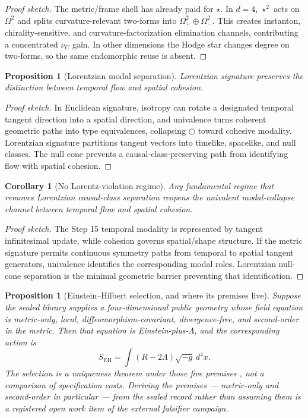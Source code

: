\documentclass[11pt]{article}
\theoremstyle{plain}
\newtheorem{proposition}[theorem]{Proposition}
\newtheorem{corollary}[theorem]{Corollary}
\theoremstyle{definition}
\theoremstyle{remark}
\newenvironment{proofsketch}{\begin{proof}[Proof sketch]}{\end{proof}}
\newcommand{\Next}{\bigcirc}
\begin{document}
\begin{proofsketch}
The metric/frame shell has already paid for \(\star\). In \(d=4\), \(\star^2\) acts on \(\Omega^2\) and splits curvature-relevant two-forms into \(\Omega^2_+\oplus\Omega^2_-\). This creates instanton, chirality-sensitive, and curvature-factorization elimination channels, contributing a concentrated \(\nu_C\) gain. In other dimensions the Hodge star changes degree on two-forms, so the same endomorphic reuse is absent.
\end{proofsketch}

\begin{proposition}[Lorentzian modal separation]
Lorentzian signature preserves the distinction between temporal flow and spatial cohesion.
\end{proposition}

\begin{proofsketch}
In Euclidean signature, isotropy can rotate a designated temporal tangent direction into a spatial direction, and univalence turns coherent geometric paths into type equivalences, collapsing \(\Next\) toward cohesive modality. Lorentzian signature partitions tangent vectors into timelike, spacelike, and null classes. The null cone prevents a causal-class-preserving path from identifying flow with spatial cohesion.
\end{proofsketch}

\begin{corollary}[No Lorentz-violation regime]
Any fundamental regime that removes Lorentzian causal-class separation reopens the univalent modal-collapse channel between temporal flow and spatial cohesion.
\end{corollary}

\begin{proofsketch}
The Step 15 temporal modality is represented by tangent infinitesimal update, while cohesion governs spatial/shape structure. If the metric signature permits continuous symmetry paths from temporal to spatial tangent generators, univalence identifies the corresponding modal roles. Lorentzian null-cone separation is the minimal geometric barrier preventing that identification.
\end{proofsketch}

\begin{proposition}[Einstein--Hilbert selection, and where its premises live]
Suppose the sealed library supplies a four-dimensional public geometry whose field equation is metric-only, local, diffeomorphism-covariant, divergence-free, and second-order in the metric. Then that equation is Einstein-plus-\(\Lambda\), and the corresponding action is
\[
S_{\mathrm{EH}}=\int (R-2\Lambda)\sqrt{-g}\,d^4x .
\]
The selection is a uniqueness theorem under those five premises \cite{lovelock}, not a comparison of specification costs. Deriving the premises --- metric-only and second-order in particular --- from the sealed record rather than assuming them is a registered open work item of the external falsifier campaign.
\end{proposition}
\end{document}
